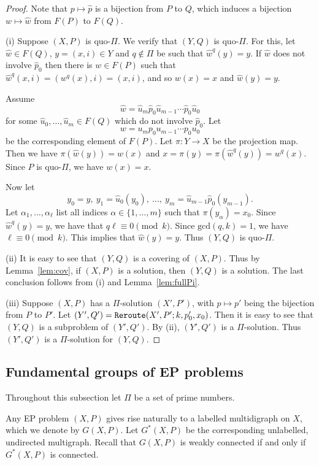 \documentclass[11pt]{amsart}
\theoremstyle{definition}
\theoremstyle{definition}
\numberwithin{equation}{section}
\begin{document}
\begin{proof} Note that $p\mapsto \hat{p}$ is a bijection from $P$ to $Q$, which induces a bijection $w\mapsto \hat{w}$ from $F(P)$ to $F(Q)$.  

(i) Suppose $(X, P)$ is quo-$\Pi$. We verify that $(Y, Q)$ is quo-$\Pi$. For this, let $\hat{w}\in F(Q)$, $y=(x,i)\in Y$ and $q\not\in \Pi$ be such that $\hat{w}^q(y)=y$. If $\hat{w}$ does not involve $\hat{p}_0$ then there is $w\in F(P)$ such that $\hat{w}^q(x,i)=(w^q(x),i)=(x,i)$, and so $w(x)=x$ and $\hat{w}(y)=y$. 

Assume 
$$ \hat{w}=\hat{u}_m \hat{p}_0 \hat{u}_{m-1} \cdots\hat{p}_0\hat{u}_0 $$
for some $\hat{u}_0,\dots, \hat{u}_m\in F(Q)$ which do not involve $\hat{p}_0$. Let
$$ w=u_mp_0u_{m-1}\cdots p_0u_0 $$
be the corresponding element of $F(P)$. Let $\pi\colon Y\to X$ be the projection map. Then we have $\pi(\hat{w}(y))=w(x)$ and $x=\pi(y)=\pi(\hat{w}^q(y))=w^q(x)$. Since $P$ is quo-$\Pi$, we have $w(x)=x$. 

Now let
$$y_0=y,\ y_1=\hat{u}_0(y_0),\ \dots,\ y_m=\hat{u}_{m-1}\hat{p}_0(y_{m-1}).$$
Let $\alpha_1, \dots, \alpha_\ell$ list all indices $\alpha\in\{1, \dots, m\}$ such that $\pi(y_\alpha)=x_0$. Since $\hat{w}^q(y)=y$, we have that $q\ell\equiv 0\pmod{k}$. Since $\mbox{gcd}(q,k)=1$, we have $\ell\equiv 0\pmod{k}$. This implies that $\hat{w}(y)=y$. Thus $(Y, Q)$ is quo-$\Pi$.

(ii) It is easy to see that $(Y,Q)$ is a covering of $(X, P)$. Thus by Lemma~\ref{lem:cov}, if $(X, P)$ is a solution, then $(Y, Q)$ is a solution. The last conclusion follows from (i) and Lemma~\ref{lem:fullPi}.

(iii) Suppose $(X, P)$ has a $\Pi$-solution $(X', P')$, with $p\mapsto p'$ being the bijection from $P$ to $P'$. Let $(Y', Q')=\mbox{\tt Reroute}(X', P'; k, p_0', x_0)$. Then it is easy to see that $(Y, Q)$ is a subproblem of $(Y', Q')$. By (ii), $(Y', Q')$ is a $\Pi$-solution. Thus $(Y', Q')$ is a $\Pi$-solution for $(Y, Q)$.
\end{proof}






\subsection{Fundamental groups of EP problems\label{subsec:fundamentalgroup}} Throughout this subsection let $\Pi$ be a set of prime numbers.

Any EP problem $(X, P)$ gives rise naturally to a labelled multidigraph on $X$, which we denote by $G(X, P)$. Let $G^*(X, P)$ be the corresponding unlabelled, undirected multigraph. Recall that $G(X, P)$ is weakly connected if and only if $G^*(X, P)$ is connected. 
\end{document}

